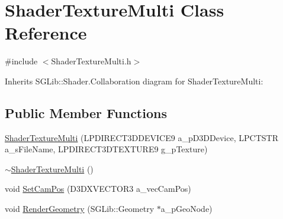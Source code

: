 \hypertarget{class_shader_texture_multi}{
\section{ShaderTextureMulti Class Reference}
\label{class_shader_texture_multi}
}


{\ttfamily \#include $<$ShaderTextureMulti.h$>$}

Inherits SGLib::Shader.Collaboration diagram for ShaderTextureMulti:\subsection*{Public Member Functions}
\begin{DoxyCompactItemize}
\item 
\hyperlink{class_shader_texture_multi_a55ca9f9bfb7d65ab89cf0a41b67fbf69}{ShaderTextureMulti} (LPDIRECT3DDEVICE9 a\_\-pD3DDevice, LPCTSTR a\_\-sFileName, LPDIRECT3DTEXTURE9 g\_\-pTexture)
\item 
\hyperlink{class_shader_texture_multi_ac401c19016cd9bae283bd2b4fc91e84d}{$\sim$ShaderTextureMulti} ()
\item 
void \hyperlink{class_shader_texture_multi_a30155c23904b627480b7821f85854390}{SetCamPos} (D3DXVECTOR3 a\_\-vecCamPos)
\item 
void \hyperlink{class_shader_texture_multi_a2fbc89fdebf09b156d399337b2b39f24}{RenderGeometry} (SGLib::Geometry $\ast$a\_\-pGeoNode)
\end{DoxyCompactItemize}


